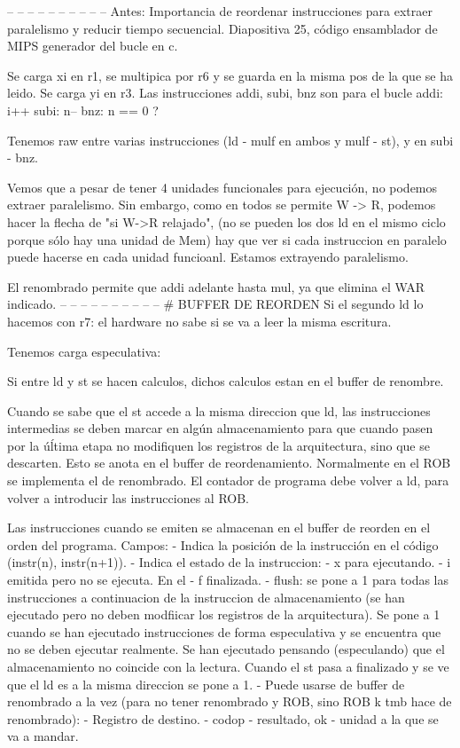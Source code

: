-- -- -- -- -- 
-- -- -- -- -- 
Antes: Importancia de reordenar instrucciones para extraer paralelismo y reducir tiempo secuencial.
Diapositiva 25, código ensamblador de MIPS generador del bucle en c.


Se carga xi en r1, se multipica por r6 y se guarda en la misma pos de la que se ha leido.
Se carga yi en r3.
Las instrucciones addi, subi, bnz son para el bucle
addi: i++
subi: n--
bnz: n == 0 ?

Tenemos raw entre varias instrucciones (ld - mulf en ambos y mulf - st), y en subi - bnz.

Vemos que a pesar de tener 4 unidades funcionales para ejecución, no podemos extraer paralelismo. 
Sin embargo, como en todos se permite W -> R, podemos hacer la flecha de "si W->R relajado", (no se pueden los dos ld en el mismo ciclo porque sólo hay una unidad de Mem) hay que ver si cada instruccion en paralelo puede hacerse en cada unidad funcioanl. Estamos extrayendo paralelismo.

El renombrado permite que addi adelante hasta mul, ya que elimina el WAR indicado.
-- -- -- -- -- 
-- -- -- -- -- 
# BUFFER DE REORDEN
Si el segundo ld lo hacemos con r7: el hardware no sabe si se va a leer la misma escritura.

Tenemos carga especulativa: 

Si entre ld y st se hacen calculos, dichos calculos estan en el buffer de renombre.

Cuando se sabe que el st accede a la misma direccion que ld, las instrucciones intermedias se deben marcar en algún almacenamiento para que cuando pasen por la úĺtima etapa no modifiquen los registros de la arquitectura, sino que se descarten. Esto se anota en el buffer de reordenamiento. Normalmente en el ROB se implementa el de renombrado.
El contador de programa debe volver a ld, para volver a introducir las instrucciones al ROB.

Las instrucciones cuando se emiten se almacenan en el buffer de reorden en el orden del programa. Campos:
- Indica la posición de la instrucción en el código (instr(n), instr(n+1)).
- Indica el estado de la instruccion:
    - x para ejecutando.
    - i emitida pero no se ejecuta. En el 
    - f finalizada.
- flush: se pone a 1 para todas las instrucciones a continuacion de la instruccion de almacenamiento (se han ejecutado pero no deben modfiicar los registros de la arquitectura).
Se pone a 1 cuando se han ejecutado instrucciones de forma especulativa y se encuentra que no se deben ejecutar realmente. Se han ejecutado pensando (especulando) que el almacenamiento no coincide con la lectura.
Cuando el st pasa a finalizado y se ve que el ld es a la misma direccion se pone a 1.
- Puede usarse de buffer de renombrado a la vez (para no tener renombrado y ROB, sino ROB k tmb hace de renombrado):
- Registro de destino.
- codop
- resultado, ok
- unidad a la que se va a mandar.

